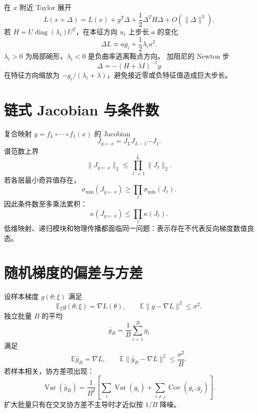\documentclass[11pt]{article}
\numberwithin{equation}{section}
\newcommand{\E}{\mathbb{E}}
\newcommand{\1}{\mathbf{1}}
\newcommand{\diag}{\operatorname{diag}}
\newcommand{\Var}{\operatorname{Var}}
\newcommand{\Cov}{\operatorname{Cov}}
\begin{document}
在 $x$ 附近 Taylor 展开
\begin{equation}
 L(x+\Delta)=L(x)+g^T\Delta
 +\frac12\Delta^TH\Delta+O(\|\Delta\|^3).
\end{equation}
若 $H=U\diag(\lambda_i)U^T$，在本征方向 $u_i$ 上步长 $a$ 的变化
\begin{equation}
 \Delta L\approx a g_i+\frac12\lambda_i a^2.
\end{equation}
$\lambda_i>0$ 为局部碗形，$\lambda_i<0$ 是负曲率逃离鞍点方向。
加阻尼的 Newton 步
\begin{equation}
 \Delta=-(H+\lambda I)^{-1}g
\end{equation}
在特征方向缩放为 $-g_i/(\lambda_i+\lambda)$，避免接近零或负特征值造成巨大步长。

\section{链式 Jacobian 与条件数}

复合映射 $y=f_L\circ\cdots\circ f_1(x)$ 的 Jacobian
\begin{equation}
 J_{y\leftarrow x}=J_LJ_{L-1}\cdots J_1.
\end{equation}
谱范数上界
\begin{equation}
 \|J_{y\leftarrow x}\|_2\le\prod_{\ell=1}^{L}\|J_\ell\|_2.
\end{equation}
若各层最小奇异值存在，
\begin{equation}
 \sigma_{\min}(J_{y\leftarrow x})
 \ge\prod_\ell\sigma_{\min}(J_\ell).
\end{equation}
因此条件数至多乘法累积：
\begin{equation}
 \kappa(J_{y\leftarrow x})
 \le\prod_\ell\kappa(J_\ell).
\end{equation}
低维映射、递归模块和物理传播都面临同一问题：表示存在不代表反向梯度数值良态。

\section{随机梯度的偏差与方差}

设样本梯度 $g(\theta;\xi)$ 满足
\begin{equation}
 \E_\xi g(\theta;\xi)=\nabla L(\theta),
 \qquad \E\|g-\nabla L\|^2\le\sigma^2.
\end{equation}
独立批量 $B$ 的平均
\begin{equation}
 \bar g_B=\frac1B\sum_{i=1}^{B}g_i
\end{equation}
满足
\begin{equation}
 \E\bar g_B=\nabla L,\qquad
 \E\|\bar g_B-\nabla L\|^2\le\frac{\sigma^2}{B}.
\end{equation}
若样本相关，协方差项出现：
\begin{equation}
 \Var(\bar g_B)=\frac1{B^2}\left[
 \sum_i\Var(g_i)+\sum_{i\ne j}\Cov(g_i,g_j)
 \right].
\end{equation}
扩大批量只有在交叉协方差不主导时才近似按 $1/B$ 降噪。
\end{document}
